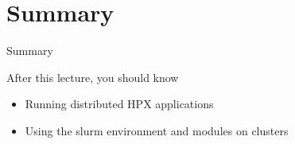 \documentclass[\classoption]{beamer}
\begin{document}
\section{Summary}
\begin{frame}{Summary}
\begin{block}{After this lecture, you should know}
\begin{itemize}
\item Running distributed HPX applications
\item Using the slurm environment and modules on clusters
\end{itemize}
\end{block}
\end{frame}
\end{document}
